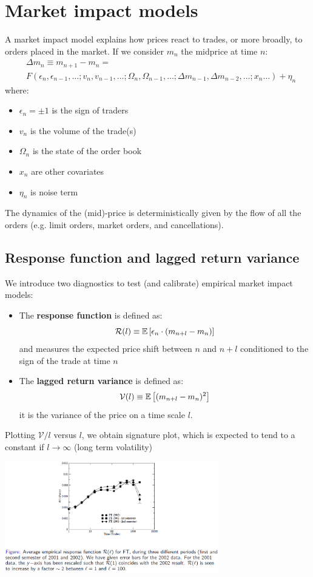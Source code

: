 \chapter{Market impact models}
\label{chap:market_impact_models}
A market impact model explains how prices react to trades, or more broadly, to orders placed in the market. If we consider $m_n$ the midprice at time $n$:
\begin{align*}
	& \Delta m_n \equiv m_{n+1} - m_n = \\
	&F(\epsilon_n, \epsilon_{n-1},\ldots;v_n,v_{n-1},\ldots;\Omega_n,\Omega_{n-1},\ldots;\Delta m_{n-1},\Delta m_{n-2},\ldots; x_n \ldots) + \eta_n
\end{align*}
where:
\begin{itemize}
	\item $\epsilon_n = \pm 1$ is the sign of traders
	\item $v_n$ is the volume of the trade(s)
	\item $\Omega_n$ is the state of the order book
	\item $x_n$ are other covariates
	\item $\eta_n$ is noise term
\end{itemize}
The dynamics of the (mid)-price is deterministically given by the flow of all the orders (e.g. limit orders, market orders, and cancellations).
\section{Response function and lagged return variance}
We introduce two diagnostics to test (and calibrate) empirical market impact models:
\begin{itemize}
	\item The \textbf{response function} is defined as:
	\[
	\mathcal{R}\mathnormal{(l)} \equiv \mathbb{E}\left[\epsilon_n \cdot (m_{n+l} - m_n)\right]
	\]
	and measures the expected price shift between $n$ and $n+l$ conditioned to the sign of the trade at time $n$
	\item The \textbf{lagged return variance} is defined as:
	\[
	\mathcal{V}(l) \equiv \mathbb{E}\left[(m_{n+l} -m_n)^2\right]
	\]
	it is the variance of the price on a time scale $l$.
\end{itemize}
Plotting $\mathcal{V}/l$ versus $l$, we obtain signature plot, which is expected to tend to a constant if $l \to \infty$ (long term volatility)
\begin{center}
	\includegraphics[width=0.7\textwidth]{picture/(6)empirical_response.png}
\end{center}
